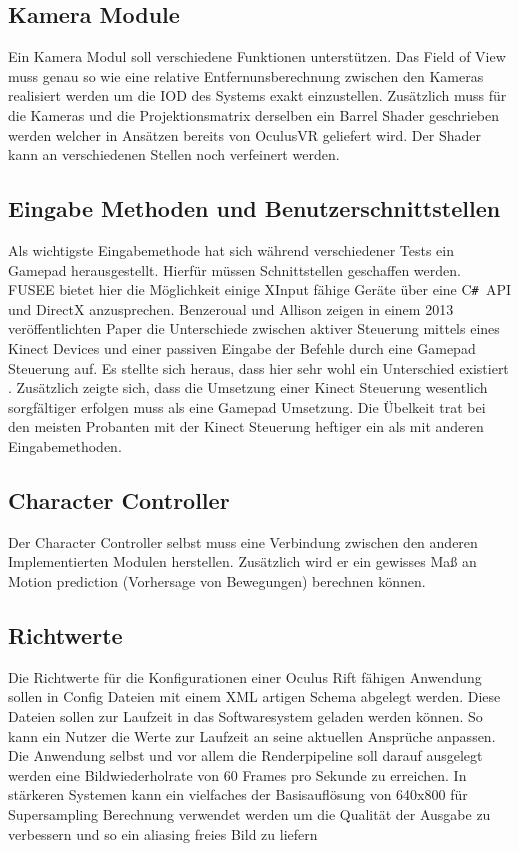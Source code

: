 \documentclass[pagesize, paper=a4, fontsize=12pt,titlepage=true, headings=small, headnosepline, abstractoff, liststotoc, nochapterprefix, plainheadsepline]{scrreprt}
\newcommand{\CSS}{C\texttt{\# }}
\begin{document}
\subsection{Kamera Module}
Ein Kamera Modul soll verschiedene Funktionen unterstützen. Das Field of View muss genau  so wie eine relative Entfernunsberechnung zwischen den Kameras realisiert werden um die IOD des Systems exakt einzustellen. Zusätzlich muss für die Kameras und die Projektionsmatrix derselben ein Barrel Shader geschrieben werden welcher in Ansätzen bereits von OculusVR geliefert wird. Der Shader kann an verschiedenen Stellen noch verfeinert werden.

\subsection{Eingabe Methoden und Benutzerschnittstellen}
Als wichtigste Eingabemethode hat sich während verschiedener Tests ein Gamepad herausgestellt. Hierfür müssen Schnittstellen geschaffen werden. FUSEE bietet hier die Möglichkeit einige XInput fähige Geräte über eine \CSS API und DirectX anzusprechen. Benzeroual und Allison zeigen in einem 2013 veröffentlichten Paper die Unterschiede zwischen aktiver Steuerung mittels eines Kinect Devices und einer passiven Eingabe der Befehle durch eine Gamepad Steuerung auf. Es stellte sich heraus, dass  hier sehr wohl ein Unterschied existiert \cite{BenzAllison2013}. Zusätzlich zeigte sich, dass die Umsetzung einer Kinect Steuerung wesentlich sorgfältiger erfolgen muss als eine Gamepad Umsetzung. Die Übelkeit trat bei den meisten Probanten mit der Kinect Steuerung heftiger ein als mit anderen Eingabemethoden.

\subsection{Character Controller}
Der Character Controller selbst muss eine Verbindung zwischen den anderen Implementierten Modulen herstellen. Zusätzlich wird er ein gewisses Maß an Motion prediction (Vorhersage von Bewegungen) berechnen können.

\subsection{Richtwerte}
Die Richtwerte für die Konfigurationen einer Oculus Rift fähigen Anwendung sollen in Config Dateien mit einem XML artigen Schema abgelegt werden. Diese Dateien sollen zur Laufzeit in das Softwaresystem geladen werden können. So kann ein Nutzer die Werte zur Laufzeit an seine aktuellen Ansprüche anpassen. Die Anwendung selbst und vor allem die Renderpipeline soll darauf ausgelegt werden eine Bildwiederholrate von 60 Frames pro Sekunde zu erreichen. In stärkeren Systemen kann ein vielfaches der Basisauflösung von 640x800 für Supersampling Berechnung verwendet werden um die Qualität der Ausgabe zu verbessern und so ein aliasing freies Bild zu liefern
\end{document}
